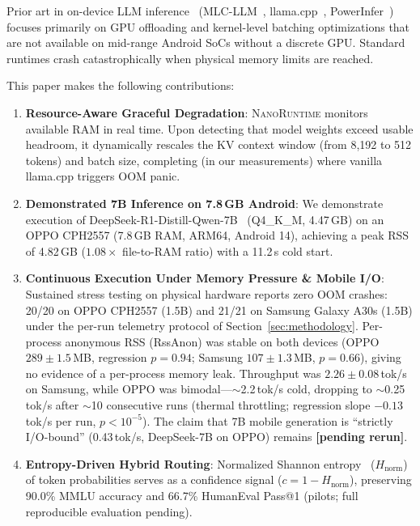 \documentclass[11pt]{article}
\newcommand{\nanort}{\textsc{NanoRuntime}}
\begin{document}
Prior art in on-device LLM inference~\cite{edge7b2024} (MLC-LLM~\cite{mlcllm2023},
llama.cpp~\cite{llamacpp2023}, PowerInfer~\cite{powerinfer2023})
focuses primarily on GPU offloading and kernel-level batching optimizations
that are not available on mid-range Android SoCs without a discrete GPU.
Standard runtimes crash catastrophically when physical memory limits are reached.

This paper makes the following contributions:
\begin{enumerate}
  \item \textbf{Resource-Aware Graceful Degradation}:
    \nanort{} monitors available RAM in real time. Upon detecting that model weights
    exceed usable headroom, it dynamically rescales the KV context window
    (from 8,192 to 512 tokens) and batch size, completing (in our measurements)
    where vanilla llama.cpp triggers OOM panic.

  \item \textbf{Demonstrated 7B Inference on 7.8\,GB Android}:
    We demonstrate execution of DeepSeek-R1-Distill-Qwen-7B~\cite{deepseek2024} (Q4\_K\_M, 4.47\,GB)
    on an OPPO CPH2557 (7.8\,GB RAM, ARM64, Android 14), achieving a peak RSS of
    4.82\,GB ($1.08\times$ file-to-RAM ratio) with a 11.2\,s cold start.

  \item \textbf{Continuous Execution Under Memory Pressure \& Mobile I/O}:
    Sustained stress testing on physical hardware reports zero OOM crashes:
    20/20 on OPPO CPH2557 (1.5B) and 21/21 on Samsung Galaxy A30s (1.5B) under
    the per-run telemetry protocol of Section~\ref{sec:methodology}.
    Per-process anonymous RSS (RssAnon) was stable on both devices
    (OPPO $289\pm1.5$\,MB, regression $p{=}0.94$; Samsung $107\pm1.3$\,MB,
    $p{=}0.66$), giving no evidence of a per-process memory leak. Throughput was
    $2.26\pm0.08$\,tok/s on Samsung, while OPPO was bimodal---$\sim$2.2\,tok/s
    cold, dropping to $\sim$0.25\,tok/s after $\sim$10 consecutive runs (thermal
    throttling; regression slope $-0.13$\,tok/s per run, $p{<}10^{-5}$). The
    claim that 7B mobile generation is ``strictly I/O-bound'' (0.43\,tok/s,
    DeepSeek-7B on OPPO) remains \textbf{[pending rerun]}.

  \item \textbf{Entropy-Driven Hybrid Routing}:
    Normalized Shannon entropy~\cite{shannon1948} ($H_{\text{norm}}$) of token probabilities serves as a
    confidence signal ($c = 1 - H_{\text{norm}}$), preserving 90.0\% MMLU accuracy
    and 66.7\% HumanEval Pass@1 (pilots; full reproducible evaluation pending).
\end{enumerate}
\end{document}
